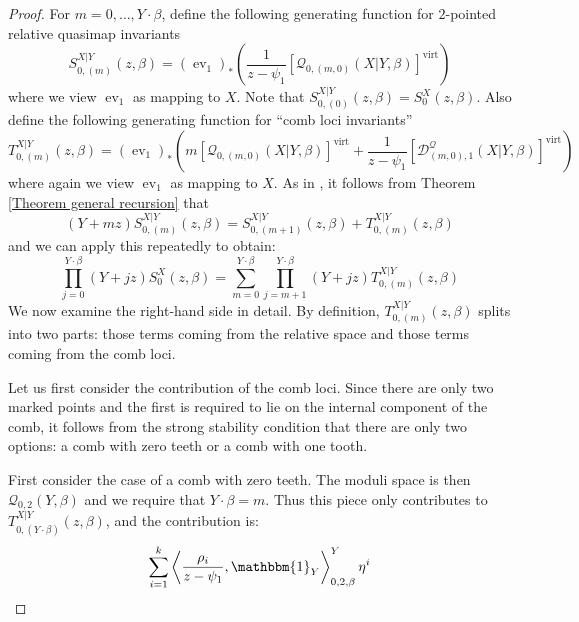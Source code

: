 \documentclass[11pt]{amsart}
\newcommand{\Q}[4]{\mathcal{Q}_{#1,#2}(#3,#4)}
\newcommand{\virt}[1]{[#1]^{\operatorname{virt}}}
\newcommand{\ev}{\operatorname{ev}}
\theoremstyle{definition}
\theoremstyle{definition}
\begin{document}
\begin{proof}
For $m = 0, \ldots, Y \cdot \beta$, define the following generating function for $2$-pointed relative quasimap invariants
 \[
  S_{0,(m)}^{X|Y}(z,\beta)=(\ev_1)_*\left(\frac{1}{z-\psi_1}\virt{\Q{0}{(m,0)}{X|Y}{\beta}}\right)
 \]
where we view $\ev_1$ as mapping to $X$.  Note that  $S_{0,(0)}^{X|Y}(z,\beta) = S_0^X(z, \beta)$. Also define the following generating function for ``comb loci invariants''
\[
 T_{0,(m)}^{X|Y}(z,\beta)=(\ev_1)_*\left(m \virt{\Q{0}{(m,0)}{X|Y}{\beta}}+\frac{1}{z-\psi_1} \virt{\mathcal{D}^{\mathcal{Q}}_{(m,0),1}(X|Y,\beta)} \right)
\]
where again we view $\ev_1$ as mapping to $X$. As in \cite[Lemma 1.2]{Ga-MF}, it follows from Theorem \ref{Theorem general recursion} that
\begin{equation}
 (Y+mz) S_{0,(m)}^{X|Y}(z,\beta) = S_{0,(m+1)}^{X|Y}(z,\beta)+ T_{0,(m)}^{X|Y}(z,\beta)
\end{equation}
and we can apply this repeatedly to obtain:
\begin{equation} \label{eqn:G}
\prod_{j=0}^{Y\cdot\beta}(Y+jz) S_0^X(z,\beta) = \sum_{m=0}^{Y\cdot\beta}\prod_{j=m+1}^{Y\cdot\beta}(Y+jz)T_{0,(m)}^{X|Y}(z,\beta)
\end{equation}
We now examine the right-hand side in detail. By definition, $T_{0,(m)}^{X|Y}(z,\beta)$ splits into two parts: those terms coming from the relative space and those terms coming from the comb loci.

Let us first consider the contribution of the comb loci. Since there are only two marked points and the first is required to lie on the internal component of the comb, it follows from the strong stability condition that there are only two options: a comb with zero teeth or a comb with one tooth.

First consider the case of a comb with zero teeth. The moduli space is then $\Q{0}{2}{Y}{\beta}$ and we require that $Y \cdot \beta = m$. Thus this piece only contributes to $T_{0,(Y\cdot\beta)}^{X|Y}(z,\beta)$, and the contribution is:
\begin{equation*} \sum_{i=1}^k \left\langle \dfrac{\rho_i}{z-\psi_1}, \mathbbm{1}_Y \right\rangle_{0,2,\beta}^Y \eta^i \end{equation*}


\end{proof}
\end{document}
